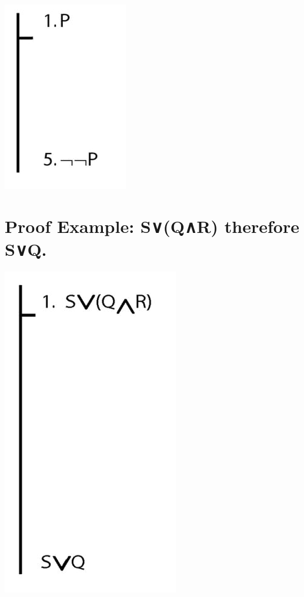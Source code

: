 \documentclass[12pt]{extarticle}
\begin{document}
\begin{multicols*}{3}
\begin{center}
\includegraphics[scale=0.3]{img/unit_823_proof.png}
\end{center}
 
 
\section{Proof Example: S∨(Q∧R) therefore S∨Q.}
 
\begin{center}
\includegraphics[scale=0.3]{img/unit_824_proof.png}
\end{center}
\vfill

 


\end{multicols*}
\end{document}
